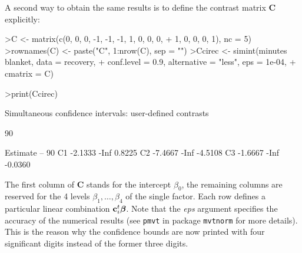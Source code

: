 \documentclass{article}
\newcommand{\bbeta}{\mbox{\boldmath $\beta$}}
\newcommand{\bc}{{\mathbf{c}}}
\newcommand{\bC}{{\mathbf{C}}}
\begin{document}
A second way to obtain the same results is to define the contrast
matrix $\bC$ explicitly:
\small
\begin{Schunk}
\begin{Sinput}
>C <- matrix(c(0, 0, 0, -1, -1, -1, 1, 0, 0, 0, 
+     1, 0, 0, 0, 1), nc = 5)
>rownames(C) <- paste("C", 1:nrow(C), sep = "")
>Ccirec <- simint(minutes ~ blanket, data = recovery, 
+     conf.level = 0.9, alternative = "less", eps = 1e-04, 
+     cmatrix = C)
\end{Sinput}
\end{Schunk}
\begin{Schunk}
\begin{Sinput}
>print(Ccirec)
\end{Sinput}
\begin{Soutput}
	Simultaneous confidence intervals: user-defined
	contrasts

	90 % confidence intervals

   Estimate   --    90 %
C1  -2.1333 -Inf  0.8225
C2  -7.4667 -Inf -4.5108
C3  -1.6667 -Inf -0.0360
\end{Soutput}
\end{Schunk}
\normalsize
The first column of $\bC$ stands for the intercept $\beta_0$, the
remaining columns are reserved for the 4 levels $\beta_1, \dots,
\beta_4$ of the single factor. Each row defines a particular
linear combination $\bc_i^t \bbeta$. Note that the {\em eps} argument
specifies the accuracy of the numerical results (see \texttt{pmvt} in package
\texttt{mvtnorm} for more details). This is the reason why
the confidence bounds are now printed with four significant digits 
instead of the former three digits.
\end{document}

